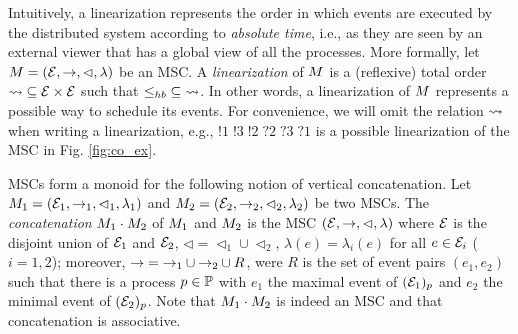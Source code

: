 Intuitively, a linearization represents the order in which events are executed by the distributed system according to \emph{absolute time}, i.e., as they are seen by an external viewer that has a global view of all the processes. More formally, let $M = (\mathcal{E},\to,\lhd,\lambda)$ be an MSC.
A \emph{linearization} of $M$ is a (reflexive) total order ${\rightsquigarrow} \subseteq \mathcal{E} \times \mathcal{E}$ such that ${\leq_{hb}} \subseteq {\rightsquigarrow}$. In other words, a linearization of $M$ represents a possible way to schedule its events. For convenience, we will omit the relation $\rightsquigarrow$ when writing a linearization, e.g., $!1\;!3\;!2\;?2\;?3\;?1$ is a possible linearization of the MSC in Fig. \ref{fig:co_ex}.

MSCs form a monoid for the following notion of vertical concatenation.
Let $M_1 = (\mathcal{E}_1,\to_1,\lhd_1,\lambda_1)$ and
$M_2 = (\mathcal{E}_2,\to_2,\lhd_2,\lambda_2)$ be two MSCs.
The \emph{concatenation} $M_1 \cdot M_2$ of $M_1$ and $M_2$ is the MSC 
$(\mathcal{E},\to,\lhd,\lambda)$ where $\mathcal{E}$ is the disjoint 
union of $\mathcal{E}_1$ and $\mathcal{E}_2$,
${\lhd}  = {\lhd_1} \cup {\lhd_2}$, $\lambda(e)=\lambda_i(e)$ for all $e\in \mathcal{E}_i$ ($i=1,2$); 
moreover, ${\to} = {\to_1} \cup {\to_2} \cup R$,
were $R$ is the set of event pairs $(e_1,e_2)$ 
such that there is a process $p \in \mathbb{P}$ with $e_1$ the maximal event of 
$(\mathcal{E}_1)_p$ and $e_2$ the minimal event of
$(\mathcal{E}_2)_p$.
Note that $M_1 \cdot M_2$ is indeed an MSC and that
concatenation is associative.


